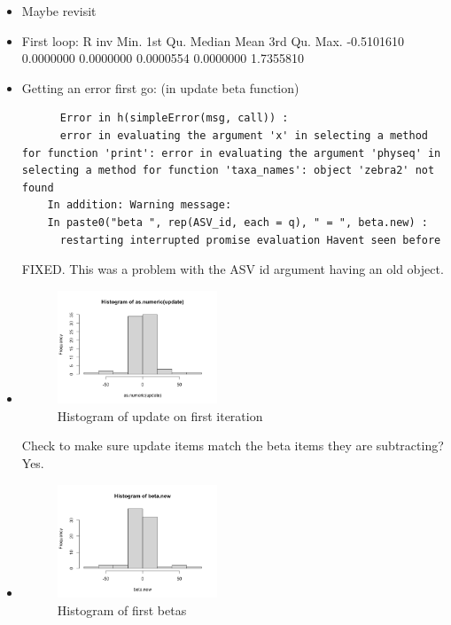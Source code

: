 \documentclass[10pt]{article}
\theoremstyle{definition}
\begin{document}
\begin{itemize}
  \item Maybe revisit
  \item First loop: R inv
        Min.    1st Qu.     Median       Mean    3rd Qu.       Max.
  -0.5101610  0.0000000  0.0000000  0.0000554  0.0000000  1.7355810


  \item Getting an error first go: (in update beta function)

  \begin{verbatim}
      Error in h(simpleError(msg, call)) :
      error in evaluating the argument 'x' in selecting a method for function 'print': error in evaluating the argument 'physeq' in selecting a method for function 'taxa_names': object 'zebra2' not found
    In addition: Warning message:
    In paste0("beta ", rep(ASV_id, each = q), " = ", beta.new) :
      restarting interrupted promise evaluation Havent seen before
  \end{verbatim}

  FIXED. This was a problem with the ASV id argument having an old object.

\item
\begin{figure}[!htb]
	\centering
	\includegraphics[width=0.45\textwidth]{img/Spring_2022_Journal-79240294.png}
	\caption{Histogram of update on first iteration }
	\label{}


\end{figure}
Check to make sure update items match the beta items they are subtracting? Yes.
\item

\begin{figure}[!htb]
	\centering
	\includegraphics[width=0.45\textwidth]{img/Spring_2022_Journal-799ded17.png}
	\caption{Histogram of first betas }
	\label{}
\end{figure}


\end{itemize}
\end{document}
